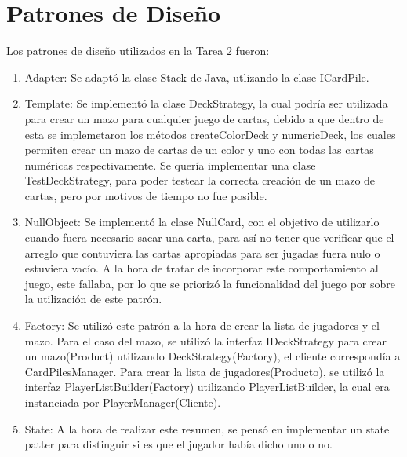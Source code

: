 \documentclass[letterpaper,11pt]{article}
\begin{document}
\newpage

\section{Patrones de Diseño}

Los patrones de diseño utilizados en la Tarea 2 fueron:

\begin{enumerate}
\item Adapter: Se adaptó la clase Stack de Java, utlizando la clase ICardPile.

\item Template: Se implementó la clase DeckStrategy, la cual podría ser utilizada para crear un mazo para cualquier juego de cartas, debido a que dentro de esta se implemetaron los métodos createColorDeck y numericDeck, los cuales permiten crear un mazo de cartas de un color y uno con todas las cartas numéricas respectivamente. Se quería implementar una clase TestDeckStrategy, para poder testear la correcta creación de un mazo de cartas, pero por motivos de tiempo no fue posible.

\item NullObject: Se implementó la clase NullCard, con el objetivo de utilizarlo cuando fuera necesario sacar una carta, para así no tener que verificar que el arreglo que contuviera las cartas apropiadas para ser jugadas fuera nulo o estuviera vacío. A la hora de tratar de incorporar este comportamiento al juego, este fallaba, por lo que se priorizó la funcionalidad del juego por sobre la utilización de este patrón.

\item Factory: Se utilizó este patrón a la hora de crear la lista de jugadores y el mazo. Para el caso del mazo, se utilizó la interfaz IDeckStrategy para crear un mazo(Product) utilizando DeckStrategy(Factory), el cliente correspondía a CardPilesManager.  Para crear la lista de jugadores(Producto), se utilizó la interfaz PlayerListBuilder(Factory) utilizando PlayerListBuilder, la cual era instanciada por PlayerManager(Cliente).

\item State: A la hora de realizar este resumen, se pensó en implementar un state patter para distinguir si es que el jugador había dicho uno o no.
\end{enumerate}
\end{document}
